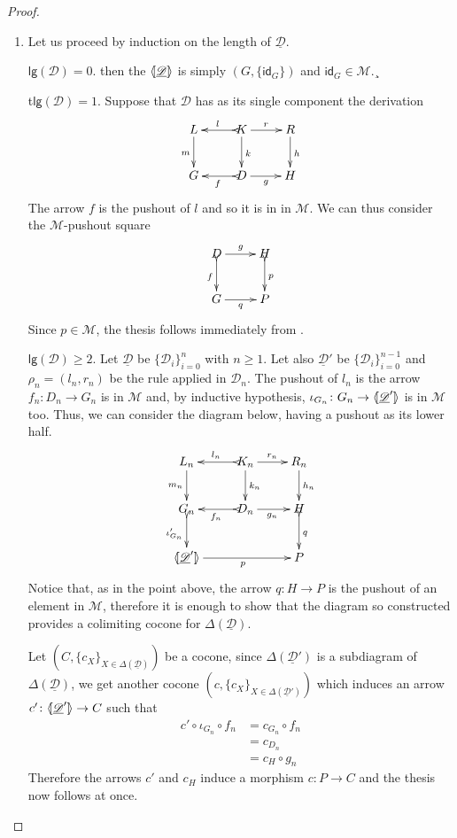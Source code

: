 \documentclass[a4paper,UKenglish,cleveref,pdftex, thm-restate,numberwithinsect]{lipics}
\newcommand{\id}[1]{\mathsf{id}_{#1}}
\newcommand{\dder}[1]{\mathscr{#1}}
\newcommand{\der}[1]{\underline{\dder{#1}}}
\newcommand{\lpro}{\langle \hspace{-1.85pt}[}
\newcommand{\rpro}{]\hspace{-1.85pt}\rangle}
\newcommand{\tpro}[1]{\lpro \der{#1}\rpro}
\newcommand{\lgh}[0]{\mathsf{lg}}
\begin{document}
\begin{proof}
  \begin{enumerate}
  \item Let us proceed by induction on the length of $\der{D}$.
    
    
    \smallskip \noindent
    $\lgh(\dder{D})=0$. then the
    $\tpro{\dder{D}}$ is simply $(G, \{\id{G}\})$ and
    $\id{G}\in \mathcal{M}$.¸
	
    \smallskip \noinden
    t$\lgh(\dder{D})=1$. Suppose that $\dder{D}$
    has as its single component the derivation
    \[\xymatrix{L \ar[d]_{m}& K \ar[d]^{k}\ar@{>->}[l]_{l} \ar[r]^{r} & R \ar[d]^{h} \\G& \ar@{>->}[l]^{f} D \ar[r]_{g}& H  \\}\]
    The arrow $f$ is  the pushout of $l$ and so it is in in $\mathcal{M}$. We can thus consider the $\mathcal{M}$-pushout square
    \[\xymatrix{D \ar@{>->}[d]_{f} \ar[r]^{g} & H \ar@{>->}[d]^{p} \\G \ar[r]_{q}& P }\]
    Since $p\in \mathcal{M}$, the thesis follows immediately from . 
    
    \smallskip \noindent
    $\lgh(\dder{D})\geq 2$. Let $\der{D}$ be
    $\{\dder{D}_i\}_{i=0}^n$ with $n\geq 1$. Let also $\der{D}'$ be
    $\{\dder{D}_i\}^{n-1}_{i=0}$ and $\rho_n=(l_n, r_n)$ be the rule
    applied in $\dder{D}_n$. The pushout of $l_n$ is the arrow
    $f_n\colon D_n\to G_n$ is in $\mathcal{M}$ and, by inductive
    hypothesis, $\iota_{G_{n}}\colon G_{n}\to \lpro \der{D}'\rpro$ is
    in $\mathcal{M}$ too. Thus, we can consider the diagram below,
    having a pushout as its lower half.
			\[\xymatrix{L_n \ar[d]_{m_{n}}& K_{n} \ar[d]^{k_{n}}\ar@{>->}[l]_{l_{n}} \ar[r]^{r_{n}} & R_{n} \ar[d]^{h_n} \\G_{n} \ar@{>->}[d]_{\iota'_{G_{n}}}& \ar@{>->}[l]^{f_n} D_n \ar[r]_{g_n}& H  \ar@{>->}[d]^{q}\\ \lpro \der{D}' \ar[rr]_{p}\rpro && P}\] 
			Notice that, as in the point above, the arrow $q\colon H\to P$ is the pushout of an element in $\mathcal{M}$, therefore it is enough to show that the diagram so constructed provides a colimiting cocone for $\Delta(\der{D})$.
			
			Let $(C, \{c_X\}_{X\in \Delta(\der{D})})$ be a cocone, since $\Delta(\der{D}')$ is a subdiagram of $\Delta(\der{D})$, we get another cocone $(c, \{c_X\}_{X\in \Delta(\der{D}')})$ which induces an arrow $c'\colon \lpro \der{D}' \rpro \to C$ such that
			\begin{align*}
				c'\circ \iota_{G_n} \circ f_n &=c_{G_n} \circ f_n\\&= c_{D_n}\\&= c_{H}\circ g_n
			\end{align*}
			Therefore the arrows $c'$ and $c_H$ induce a morphism $c\colon P\to C$ and the thesis now follows at once.
		

\end{enumerate}
\end{proof}
\end{document}
